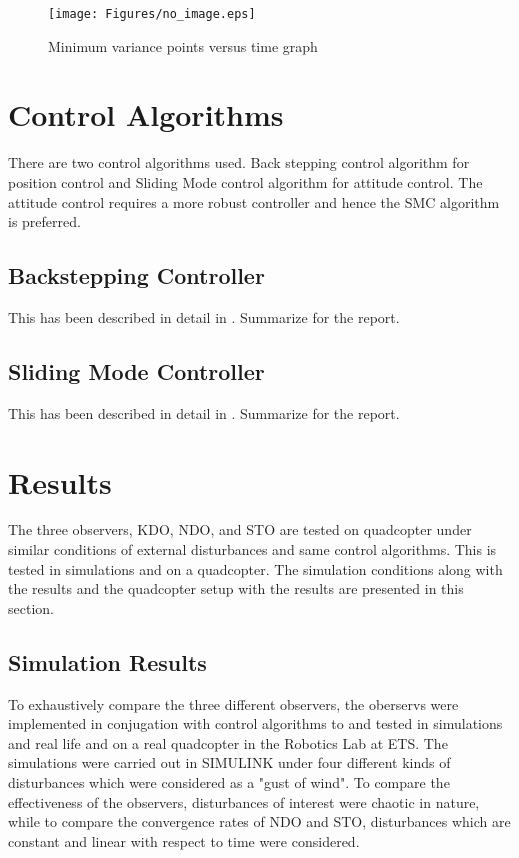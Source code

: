 \documentclass{article}
\begin{document}
\begin{figure}[H]
\centering
\texttt{[image: Figures/no\_image.eps]}
\caption{Minimum variance points versus time graph}
\label{quad_red_balls}
\end{figure}

\section{Control Algorithms}
There are two control algorithms used. Back stepping control algorithm for position control and Sliding Mode control algorithm for attitude control. The attitude control requires a more robust controller and hence the SMC algorithm is preferred. 






\subsection{Backstepping Controller}
This has been described in detail in \cite{fethalla2017backstepping}. Summarize for the report.


\subsection{Sliding Mode Controller}
This has been described in detail in \cite{fethalla2018sliding}. Summarize for the report.





\section{Results}
The three observers, KDO, NDO, and STO are tested on quadcopter under similar conditions of external disturbances and same control algorithms. This is tested in simulations and on a quadcopter. The simulation conditions along with the results and the quadcopter setup with the results are presented in this section. 

\subsection{Simulation Results}
To exhaustively compare the three different observers, the oberservs were implemented in conjugation with control algorithms to and tested in simulations and real life and on a real quadcopter in the Robotics Lab at ETS. The simulations were carried out in SIMULINK under four different kinds of disturbances which were considered as a "gust of wind". To compare the effectiveness of the observers, disturbances of interest were chaotic in nature, while to compare the convergence rates of NDO and STO, disturbances which are constant and linear with respect to time were considered. 
\end{document}

